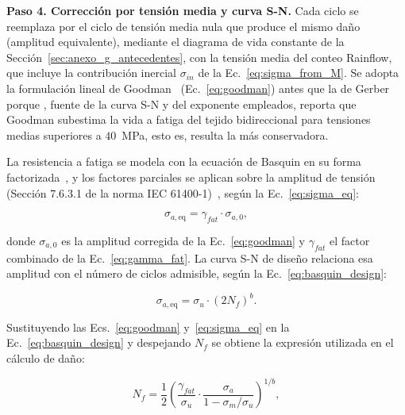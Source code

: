 \medskip
\noindent\textbf{Paso 4. Corrección por tensión media y curva S-N.}
Cada ciclo se reemplaza por el ciclo de tensión media nula que produce el mismo daño (amplitud equivalente), mediante el diagrama de vida constante de la Sección~\ref{sec:anexo_g_antecedentes}, con la tensión media del conteo Rainflow, que incluye la contribución inercial $\sigma_{in}$ de la Ec.~\ref{eq:sigma_from_M}. Se adopta la formulación lineal de Goodman~\parencite{Goodman1899} (Ec.~\ref{eq:goodman}) antes que la de Gerber porque \textcite{Huh2012}, fuente de la curva S-N y del exponente empleados, reporta que Goodman subestima la vida a fatiga del tejido bidireccional para tensiones medias superiores a $40$~MPa, esto es, resulta la más conservadora.

La resistencia a fatiga se modela con la ecuación de Basquin en su forma factorizada~\parencite{Basquin1910}, y los factores parciales se aplican sobre la amplitud de tensión (Sección 7.6.3.1 de la norma IEC 61400-1)~\parencite*{IEC61400-1}, según la Ec.~\ref{eq:sigma_eq}:

\begin{equation}
    \sigma_{a,\text{eq}} = \gamma_{fat} \cdot \sigma_{a,0},
    \label{eq:sigma_eq}
\end{equation}

donde $\sigma_{a,0}$ es la amplitud corregida de la Ec.~\ref{eq:goodman} y $\gamma_{fat}$ el factor combinado de la Ec.~\ref{eq:gamma_fat}. La curva S-N de diseño relaciona esa amplitud con el número de ciclos admisible, según la Ec.~\ref{eq:basquin_design}:

\begin{equation}
    \sigma_{a,\text{eq}} = \sigma_u \cdot (2N_f)^b.
    \label{eq:basquin_design}
\end{equation}

Sustituyendo las Ecs.~\ref{eq:goodman} y~\ref{eq:sigma_eq} en la Ec.~\ref{eq:basquin_design} y despejando $N_f$ se obtiene la expresión utilizada en el cálculo de daño:

\begin{equation}
    N_{f} = \frac{1}{2}\left(\frac{\gamma_{fat}}{\sigma_u} \cdot \frac{\sigma_{a}}{1 - \sigma_m / \sigma_u}\right)^{1/b},
    \label{eq:Nf_fatiga}
\end{equation}

